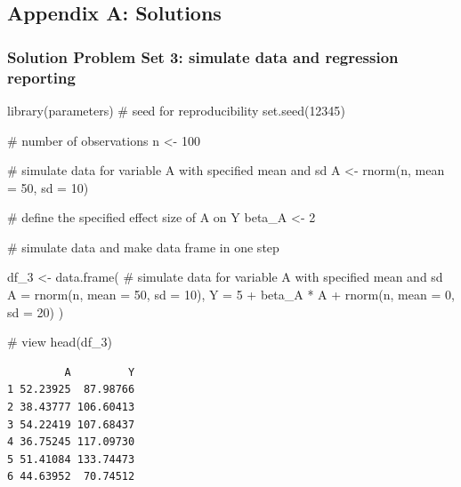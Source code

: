 \documentclass[
  singlecolumn]{article}
\newenvironment{Shaded}{}{}
\newcommand{\AttributeTok}[1]{\textcolor[rgb]{0.84,0.23,0.29}{#1}}
\newcommand{\CommentTok}[1]{\textcolor[rgb]{0.42,0.45,0.49}{#1}}
\newcommand{\DecValTok}[1]{\textcolor[rgb]{0.00,0.36,0.77}{#1}}
\newcommand{\FunctionTok}[1]{\textcolor[rgb]{0.44,0.26,0.76}{#1}}
\newcommand{\NormalTok}[1]{\textcolor[rgb]{0.14,0.16,0.18}{#1}}
\newcommand{\OtherTok}[1]{\textcolor[rgb]{0.44,0.26,0.76}{#1}}
\newcommand{\SpecialCharTok}[1]{\textcolor[rgb]{0.00,0.36,0.77}{#1}}
\theoremstyle{definition}
\theoremstyle{remark}
\begin{document}
\subsection{Appendix A: Solutions}\label{appendix-a}

\subsubsection{Solution Problem Set 3: simulate data and regression
reporting}\label{solution-problem-set-3-simulate-data-and-regression-reporting}

\begin{Shaded}
\begin{Highlighting}[]
\FunctionTok{library}\NormalTok{(parameters)}
\CommentTok{\#  seed for reproducibility}
\FunctionTok{set.seed}\NormalTok{(}\DecValTok{12345}\NormalTok{)}

\CommentTok{\# number of observations}
\NormalTok{n }\OtherTok{\textless{}{-}} \DecValTok{100}

\CommentTok{\# simulate data for variable A with specified mean and sd}
\NormalTok{A }\OtherTok{\textless{}{-}} \FunctionTok{rnorm}\NormalTok{(n, }\AttributeTok{mean =} \DecValTok{50}\NormalTok{, }\AttributeTok{sd =} \DecValTok{10}\NormalTok{)}

\CommentTok{\# define the specified effect size of A on Y}
\NormalTok{beta\_A }\OtherTok{\textless{}{-}} \DecValTok{2}


\CommentTok{\# simulate data and make data frame in one step}

\NormalTok{df\_3 }\OtherTok{\textless{}{-}} \FunctionTok{data.frame}\NormalTok{(}
  \CommentTok{\# simulate data for variable A with specified mean and sd}
  \AttributeTok{A =}  \FunctionTok{rnorm}\NormalTok{(n, }\AttributeTok{mean =} \DecValTok{50}\NormalTok{, }\AttributeTok{sd =} \DecValTok{10}\NormalTok{),}
  \AttributeTok{Y =} \DecValTok{5} \SpecialCharTok{+}\NormalTok{ beta\_A }\SpecialCharTok{*}\NormalTok{ A }\SpecialCharTok{+} \FunctionTok{rnorm}\NormalTok{(n, }\AttributeTok{mean =} \DecValTok{0}\NormalTok{, }\AttributeTok{sd =} \DecValTok{20}\NormalTok{)}
\NormalTok{)}

\CommentTok{\# view}
\FunctionTok{head}\NormalTok{(df\_3)}
\end{Highlighting}
\end{Shaded}

\begin{verbatim}
         A         Y
1 52.23925  87.98766
2 38.43777 106.60413
3 54.22419 107.68437
4 36.75245 117.09730
5 51.41084 133.74473
6 44.63952  70.74512
\end{verbatim}
\end{document}
